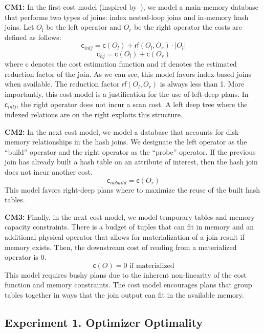 \vspace{0.25em} \noindent \textbf{CM1: } In the first cost model (inspired by~\cite{leis2015good}), we model a main-memory database that performs two types of joins: index nested-loop joins and in-memory hash joins. Let $O_l$ be the left operator and $O_r$ be the right operator the costs are defined as follows:
\[
\textsf{c}_{inlj} = \textsf{c}(O_l) + \textsf{rf}(O_l, O_r) \cdot |O_l|
\]
\[
\textsf{c}_{hj} = \textsf{c}(O_l) + \textsf{c}(O_r)
\]
where \textsf{c} denotes the cost estimation function and \textsf{rf} denotes the estimated reduction factor of the join.
As we can see, this model favors index-based joins when available. 
The reduction factor $\textsf{rf}(O_l, O_r)$ is always less than 1.
More importantly, this cost model is a justification for the use of left-deep plans.
In $\textsf{c}_{inlj}$, the right operator does not incur a scan cost.
A left deep tree where the indexed relations are on the right exploits this structure.


\vspace{0.25em} \noindent \textbf{CM2: } In the next cost model, we model a database that accounts for disk-memory relationships in the hash joins. We designate the left operator as the ``build'' operator and the right operator as the ``probe'' operator. 
If the previous join has already built a hash table on an attribute of interest, then the hash join does not incur another cost.
\[
\textsf{c}_{nobuild} = \textsf{c}(O_r)
\]
This model favors right-deep plans where to maximize the reuse of the built hash tables.


\vspace{0.25em} \noindent \textbf{CM3: } Finally, in the next cost model, we model temporary tables and memory capacity constraints. There is a budget of tuples that can fit in memory and an additional physical operator that allows for materialization of a join result if memory exists. Then, the downstream cost of reading from a materialized operator is 0.   
\[
\textsf{c}(O) = 0 \text{ if materialized}
\]
This model requires bushy plans due to the inherent non-linearity of the cost function and memory constraints. 
The cost model encourages plans that group tables together in ways that the join output can fit in the available memory.

\subsection{Experiment 1. Optimizer Optimality}



